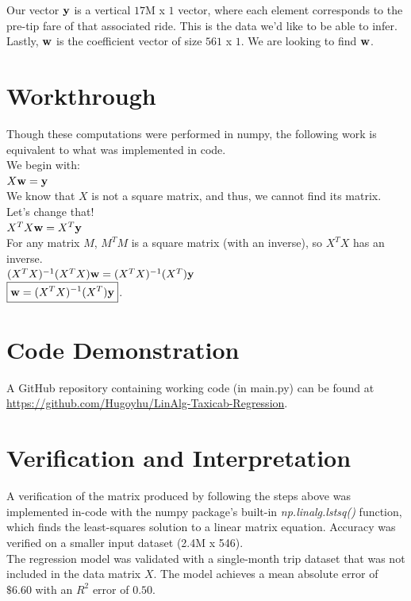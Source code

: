 \documentclass[12pt]{article}
\newcommand{\vect}[1]{\begingroup\renewcommand{\arraystretch}{0.5}\mathbf{#1}\endgroup}
\begin{document}
Our vector $\vect{y}$ is a vertical $17$M x $1$ vector, where each element corresponds to the pre-tip fare of that associated ride. This is the data we'd like 
to be able to infer.\\

Lastly, $\vect{w}$ is the coefficient vector of size $561$ x $1$. We are looking to find $\vect{w}$. \\

\section*{Workthrough}
Though these computations were performed in numpy, the following work is equivalent to what was implemented in code. \\

We begin with:\\
$X\vect{w} = \vect{y}$ \\
We know that $X$ is not a square matrix, and thus, we cannot find its matrix. Let's change that!\\

$X^T X \vect{w} = X^T \vect{y}$ \\
For any matrix $M$, $M^TM$ is a square matrix (with an inverse), so $X^TX$ has an inverse.\\

$(X^T X)^{-1} (X^T X) \vect{w} = (X^T X)^{-1} (X^T) \vect{y}$\\

$\boxed{\vect{w} = (X^TX)^{-1} (X^T) \vect{y}}$. 

\section*{Code Demonstration}
A GitHub repository containing working code (in main.py) can be found at \url{https://github.com/Hugoyhu/LinAlg-Taxicab-Regression}.

\section*{Verification and Interpretation}
A verification of the matrix produced by following the steps above was implemented in-code with the numpy package's built-in \textit{np.linalg.lstsq()} function,
which finds the least-squares solution to a linear matrix equation. Accuracy was verified on a smaller input dataset (2.4M x 546). \\

The regression model was validated with a single-month trip dataset that was not included in the data matrix $X$. The model achieves a mean absolute error of $\$6.60$ 
with an $R^2$ error of $0.50$. \\
\end{document}
